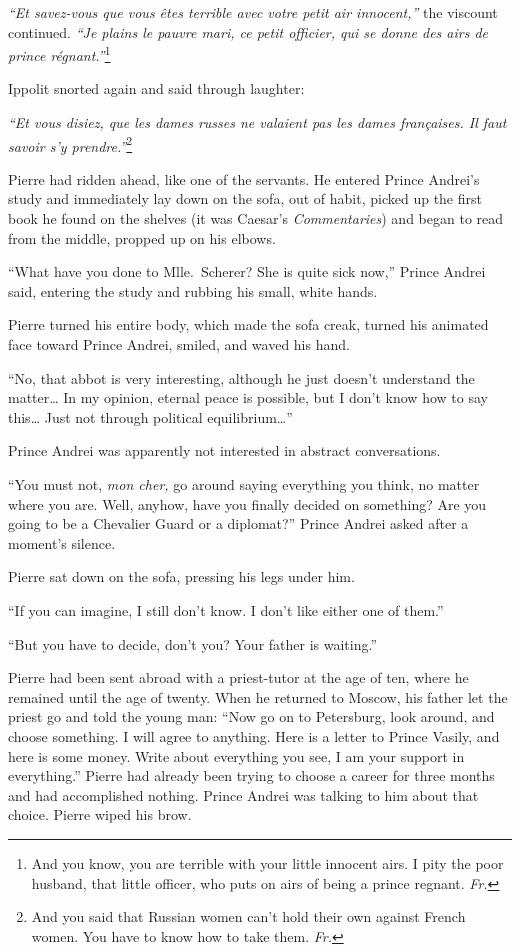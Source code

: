 \textit{``Et savez-vous que vous \^etes terrible avec votre petit air innocent,''} the viscount continued. \textit{``Je plains le pauvre mari, ce petit officier, qui se donne des airs de prince r\'egnant.''}\footnote{And you know, you are terrible with your little innocent airs. I pity the poor husband, that little officer, who puts on airs of being a prince regnant. \textit{Fr.}} %

Ippolit snorted again and said through laughter:

\textit{``Et vous disiez, que les dames russes ne valaient pas les dames fran\c caises. Il faut savoir s'y prendre.''}\footnote{And you said that Russian women can't hold their own against French women. You have to know how to take them. \textit{Fr.}}

Pierre had ridden ahead, like one of the servants. He entered Prince Andrei's study and immediately lay down on the sofa, out of habit, picked up the first book he found on the shelves (it was Caesar's \textit{Commentaries}) and began to read from the middle, propped up on his elbows.

``What have you done to Mlle.~Scherer? She is quite sick now,'' Prince Andrei said, entering the study and rubbing his small, white hands. %

Pierre turned his entire body, which made the sofa creak, turned his animated face toward Prince Andrei, smiled, and waved his hand.

``No, that abbot is very interesting, although he just doesn't understand the matter\ldots{} In my opinion, eternal peace is possible, but I don't know how to say this\ldots{} Just not through political equilibrium\ldots{}'' %

Prince Andrei was apparently not interested in abstract conversations.

``You must not, \textit{mon cher,} go around saying everything you think, no matter where you are. Well, anyhow, have you finally decided on something? Are you going to be a Chevalier Guard or a diplomat?'' Prince Andrei asked after a moment's silence. %

Pierre sat down on the sofa, pressing his legs under him.

``If you can imagine, I still don't know. I don't like either one of them.'' %

``But you have to decide, don't you? Your father is waiting.'' %

Pierre had been sent abroad with a priest-tutor at the age of ten, where he remained until the age of twenty. When he returned to Moscow, his father let the priest go and told the young man: ``Now go on to Petersburg, look around, and choose something. I will agree to anything. Here is a letter to Prince Vasily, and here is some money. Write about everything you see, I am your support in everything.'' Pierre had already been trying to choose a career for three months and had accomplished nothing. Prince Andrei was talking to him about that choice. Pierre wiped his brow.

